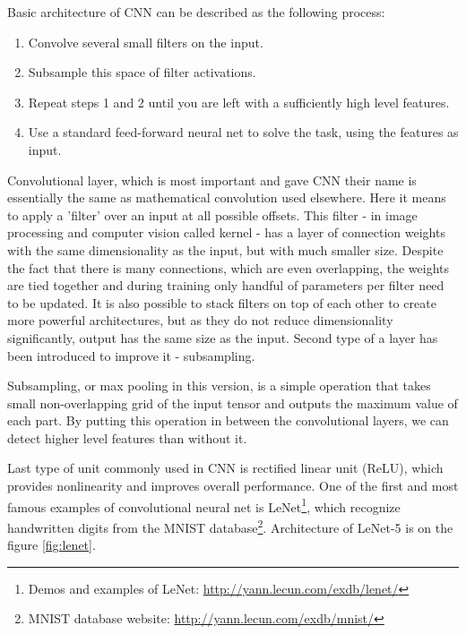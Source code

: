 Basic architecture of CNN can be described as the following process:

\vspace{8mm}
\begin{minipage}{0.9\textwidth}
\begin{enumerate}
	\item Convolve several small filters on the input.
	\item Subsample this space of filter activations.
	\item Repeat steps 1 and 2 until you are left with a sufficiently high level features.
	\item Use a standard feed-forward neural net to solve the task, using the features as input.
\end{enumerate}
\end{minipage}
\vspace{1cm}

Convolutional layer, which is most important and gave CNN their name is essentially the same as mathematical convolution used elsewhere. Here it means to apply a 'filter' over an input at all possible offsets. This filter - in image processing and computer vision called kernel - has a layer of connection weights with the same dimensionality as the input, but with much smaller size. Despite the fact that there is many connections, which are even overlapping, the weights are tied together and during training only handful of parameters per filter need to be updated. It is also possible to stack filters on top of each other to create more powerful architectures, but as they do not reduce dimensionality significantly, output has the same size as the input. Second type of a layer has been introduced to improve it - subsampling.

Subsampling, or max pooling in this version, is a simple operation that takes small non-overlapping grid of the input tensor and outputs the maximum value of each part. By putting this operation in between the convolutional layers, we can detect higher level features than without it.

Last type of unit commonly used in CNN is rectified linear unit (ReLU), which provides nonlinearity and improves overall performance\cite{jarrett-iccv-09,icml2010_NairH10}. One of the first and most famous examples of convolutional neural net is LeNet\footnote{Demos and examples of LeNet: \url{http://yann.lecun.com/exdb/lenet/}}\cite{lecun-98}, which recognize handwritten digits from the MNIST database\footnote{MNIST database website: \url{http://yann.lecun.com/exdb/mnist/}}. Architecture of LeNet-5 is on the figure \ref{fig:lenet}.

